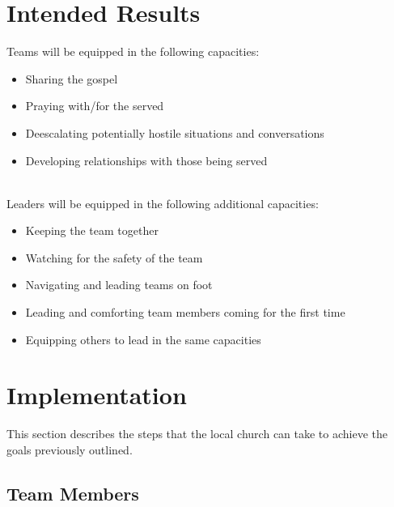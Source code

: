 \documentclass[12pt]{article}
\begin{document}

\qJamesOneTwentySeven

\section{Intended Results}

    Teams will be equipped in the following capacities:
    \begin{itemize}
        \item Sharing the gospel
        \item Praying with/for the served
        \item Deescalating potentially hostile situations and conversations
        \item Developing relationships with those being served
    \end{itemize} \\

    Leaders will be equipped in the following additional capacities:

    \begin{itemize}
        \item Keeping the team together
        \item Watching for the safety of the team
        \item Navigating and leading teams on foot
        \item Leading and comforting team members coming for the first time
        \item Equipping others to lead in the same capacities
    \end{itemize}


\section{Implementation}

This section describes the steps that the local church can take to achieve the goals previously outlined.

\subsection{Team Members}
\end{document}
